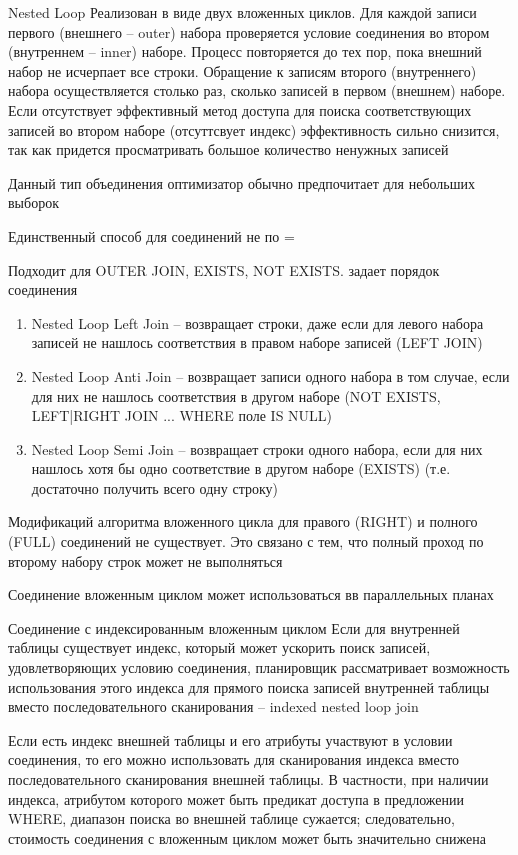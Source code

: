 \documentclass[12pt]{article}
\begin{document}
\begin{defin}{Nested Loop}
    Реализован в виде двух вложенных циклов. Для каждой записи первого (внешнего -- outer) набора проверяется условие соединения во втором (внутреннем -- inner) наборе. Процесс повторяется до тех пор, пока внешний набор не исчерпает все строки. Обращение к записям второго (внутреннего) набора осуществляется столько раз, сколько записей в первом (внешнем) наборе. Если отсутствует эффективный метод доступа для поиска соответствующих записей во втором наборе (отсуттсвует индекс) эффективность сильно снизится, так как придется просматривать большое количество ненужных записей 

    Данный тип объединения оптимизатор обычно предпочитает для небольших выборок 

    Единственный способ для соединений не по =

    Подходит для OUTER JOIN, EXISTS, NOT EXISTS. задает порядок соединения 

    \begin{enumerate}
        \item Nested Loop Left Join -- возвращает строки, даже если для левого набора записей не нашлось соответствия в правом наборе записей (LEFT JOIN)
        \item Nested Loop Anti Join -- возвращает записи одного набора в том случае, если для них не нашлось соответствия в другом наборе (NOT EXISTS, LEFT|RIGHT JOIN ... WHERE поле IS NULL)
        \item Nested Loop Semi Join -- возвращает строки одного набора, если для них нашлось хотя бы одно соответствие в другом наборе (EXISTS) (т.е. достаточно получить всего одну строку)
    \end{enumerate}

    Модификаций алгоритма вложенного цикла для правого (RIGHT) и полного (FULL) соединений не существует. Это связано с тем, что полный проход по второму набору строк может не выполняться 

    Соединение вложенным циклом может использоваться вв параллельных планах
\end{defin}

\begin{defin}{Соединение с индексированным вложенным циклом}
    Если для внутренней таблицы существует индекс, который может ускорить поиск записей, удовлетворяющих условию соединения, планировщик рассматривает возможность использования этого индекса для прямого поиска записей внутренней таблицы вместо последовательного сканирования -- indexed nested loop join 

    Если есть индекс внешней таблицы и его атрибуты участвуют в условии соединения, то его можно использовать для сканирования индекса вместо последовательного сканирования внешней таблицы. В частности, при наличии индекса, атрибутом которого может быть предикат доступа в предложении WHERE, диапазон поиска во внешней таблице сужается; следовательно, стоимость соединения с вложенным циклом может быть значительно снижена 
\end{defin}
\end{document}
